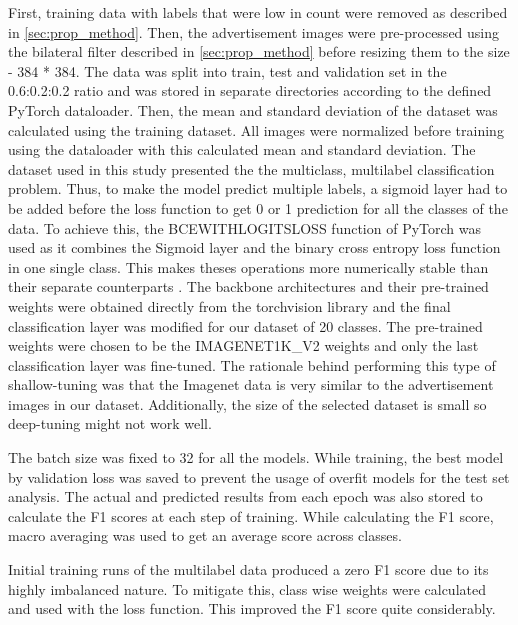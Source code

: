 \documentclass[conference]{IEEEtran}
\begin{document}
First, training data with labels that were low in count were removed as described in \ref{sec:prop_method}. 
Then, the advertisement images were pre-processed using the bilateral filter described in 
\ref{sec:prop_method} before resizing them to the size - 384 * 384. The data was split into train, test and 
validation set in the 0.6:0.2:0.2 ratio and was stored in separate directories according to the defined PyTorch 
dataloader. Then, the mean and standard deviation of the dataset was calculated using the training dataset. 
All images were normalized before training using the dataloader with this calculated 
mean and standard deviation.
The dataset used in this study presented the the multiclass, multilabel classification problem. 
Thus, to make the model predict multiple labels, a sigmoid layer had to be added before the 
loss function to get 0 or 1 prediction for all the classes of the data. To achieve this, the 
BCEWITHLOGITSLOSS function of PyTorch was used as it combines the Sigmoid layer and the 
binary cross entropy loss function in one single class. This makes 
theses operations more numerically stable than their separate counterparts \cite{bcelogits_}.
The backbone architectures and their pre-trained weights were obtained directly from the 
torchvision library and the final classification layer was modified for our dataset of 20 classes. 
The pre-trained weights were chosen to be the IMAGENET1K\_V2 weights and only the last 
classification layer was fine-tuned. The rationale behind performing this type of 
shallow-tuning was that the Imagenet data is very similar to the advertisement images in our 
dataset. Additionally, the size of the selected dataset is small so deep-tuning might not work well. 

The batch size was fixed to 32 for all the models. While training, the best model by 
validation loss was saved to prevent the usage of overfit models for the test set analysis. 
The actual and predicted results from each epoch was also stored to calculate the F1 scores at 
each step of training. While calculating the F1 score, macro averaging 
was used to get an average score across classes. 

Initial training runs of the multilabel data produced a zero F1 score due to its highly imbalanced 
nature. To mitigate this, class wise weights were calculated and used with the loss function. 
This improved the F1 score quite considerably.
\end{document}
